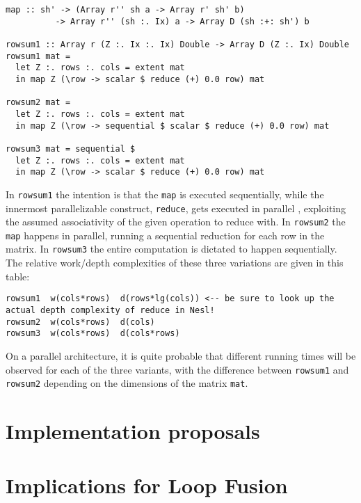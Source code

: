
\begin{verbatim}
map :: sh' -> (Array r'' sh a -> Array r' sh' b)
          -> Array r'' (sh :. Ix) a -> Array D (sh :+: sh') b

rowsum1 :: Array r (Z :. Ix :. Ix) Double -> Array D (Z :. Ix) Double
rowsum1 mat =
  let Z :. rows :. cols = extent mat
  in map Z (\row -> scalar $ reduce (+) 0.0 row) mat

rowsum2 mat =
  let Z :. rows :. cols = extent mat
  in map Z (\row -> sequential $ scalar $ reduce (+) 0.0 row) mat

rowsum3 mat = sequential $
  let Z :. rows :. cols = extent mat
  in map Z (\row -> scalar $ reduce (+) 0.0 row) mat
\end{verbatim}

In \texttt{rowsum1} the intention is that the \texttt{map} is executed
sequentially, while the innermost parallelizable construct, \texttt{reduce},
gets executed in parallel , exploiting the assumed associativity of the
given operation to reduce with.  In \texttt{rowsum2} the \texttt{map} happens
in parallel, running a sequential reduction for each row in the matrix. In
\texttt{rowsum3} the entire computation is dictated to happen sequentially.
The relative work/depth complexities of these three variations are given in
this table:

\begin{verbatim}
rowsum1  w(cols*rows)  d(rows*lg(cols)) <-- be sure to look up the actual depth complexity of reduce in Nesl!
rowsum2  w(cols*rows)  d(cols)
rowsum3  w(cols*rows)  d(cols*rows)
\end{verbatim}

On a parallel architecture, it is quite probable that different running times
will be observed for each of the three variants, with the difference between
\texttt{rowsum1} and \texttt{rowsum2} depending on the dimensions of the matrix
\texttt{mat}.

\section{Implementation proposals}


\section{Implications for Loop Fusion}
